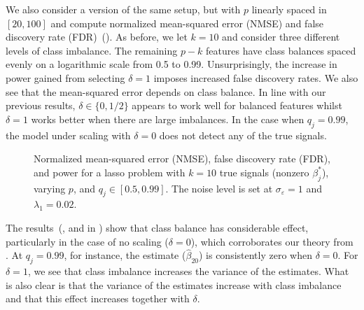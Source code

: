 We also consider a version of the same setup, but with \(p\) linearly spaced in \([20,
    100]\) and compute normalized mean-squared error (NMSE) and false discovery rate
(FDR)~(). As before, we let \(k = 10\) and consider three
different levels of class imbalance. The remaining \(p-k\) features have class balances
spaced evenly on a logarithmic scale from 0.5 to 0.99. Unsurprisingly, the increase in
power gained from selecting \(\delta = 1\) imposes increased false discovery rates. We also
see that the mean-squared error depends on class balance. In line with our previous
results, \(\delta \in \{0, 1/2\}\) appears to work well for balanced features whilst
\(\delta = 1\) works better when there are large imbalances. In the case when \(q_j =
0.99\), the model under scaling with \(\delta = 0\) does not detect any of the true
signals.

\begin{figure*}[htpb]
  \centering
  \hfill%
  \caption{%
    Normalized mean-squared error (NMSE), false discovery rate (FDR), and power for a lasso problem with
    \(k = 10\) true signals (nonzero \(\beta_j^*\)), varying \(p\), and \(q_j \in [0.5, 0.99]\). The noise level is set at \(\sigma_\varepsilon = 1\) and \(\lambda_1 = 0.02\).
  }
\end{figure*}

The results~(, and  in
) show that class balance has considerable effect,
particularly in the case of no scaling (\(\delta = 0\)), which corroborates our theory from
. At \(q_j=0.99\), for instance, the estimate
(\(\hat{\beta}_{20}\)) is consistently zero when \(\delta = 0\). For \(\delta=1\), we see
that class imbalance increases the variance of the estimates. What is also clear is that
the variance of the estimates increase with class imbalance and that this effect increases
together with \(\delta\).

